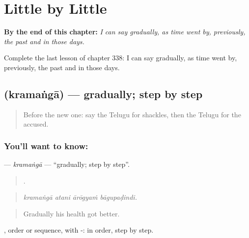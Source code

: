 
\chapter{Little by Little}
\label{ch:te-little-by-little}

\begin{chapteropening}
\textbf{By the end of this chapter:} \emph{I can say gradually, as time went by, previously, the past and in those days.}

Complete the last lesson of chapter 338: I can say gradually, as time went by, previously, the past and in those days.
\end{chapteropening}

\section[\texorpdfstring{\te{క్రమంగా} (kramaṅgā)}{క్రమంగా (kramaṅgā)}]{ (kramaṅgā) — gradually; step by step}

\label{lesson:TE-C338-kramanga}



\begin{quote}
Before the new one: say the Telugu for shackles, then the Telugu for the accused.
\end{quote}

\subsection*{You'll want to know: }
\textbf{} — \emph{kramaṅgā} — \textquotedblleft{}gradually; step by step\textquotedblright{}.

\begin{quote}
   .
\end{quote}

\begin{quote}
\emph{kramaṅgā atani ārōgyaṁ bāgupaḍindi.}
\end{quote}

\begin{quote}
Gradually his health got better.
\end{quote}

, order or sequence, with -: in order, step by step.


